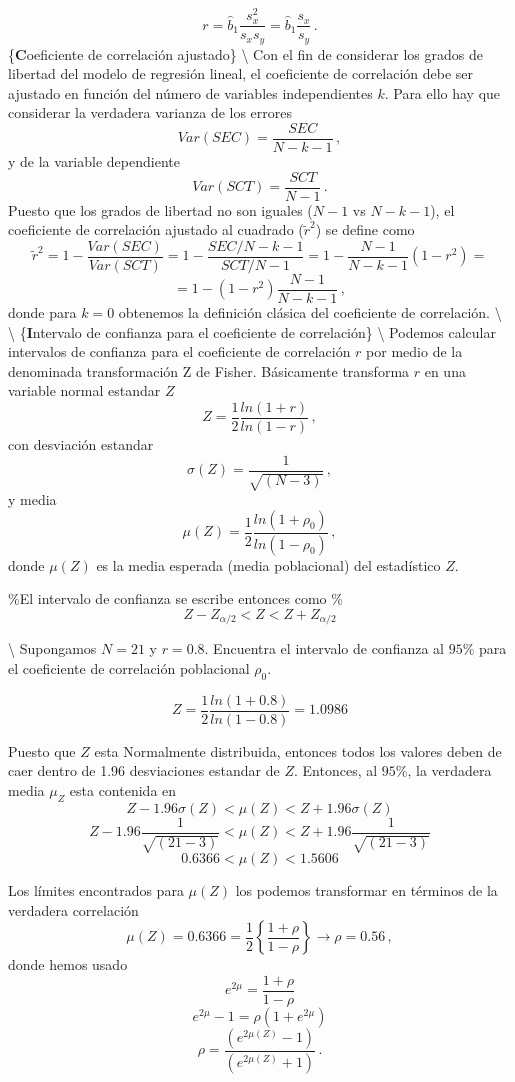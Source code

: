 \documentclass[
]{agujournal2019}
\begin{document}
\[r=\hat{b}_1\frac{s^2_x}{s_x s_y}=\hat{b}_1\frac{s_x}{s_y}\,.\]
\{\textbf Coeficiente de correlación ajustado\} \textbackslash{} Con el
fin de considerar los grados de libertad del modelo de regresión lineal,
el coeficiente de correlación debe ser ajustado en función del número de
variables independientes \(k\). Para ello hay que considerar la
verdadera varianza de los errores \[Var(SEC)=\frac{SEC}{N-k-1}\,,\] y de
la variable dependiente \[Var(SCT)=\frac{SCT}{N-1}\,.\] Puesto que los
grados de libertad no son iguales (\(N-1\) vs \(N-k-1\)), el coeficiente
de correlación ajustado al cuadrado (\(\tilde{r}^2\)) se define como
\[\tilde{r}^2=1-\frac{Var(SEC)}{Var(SCT)}=1-\frac{SEC/N-k-1}{SCT/N-1}=
1-\frac{N-1}{N-k-1}(1-r^2)=\] \[=1-(1-r^2)\frac{N-1}{N-k-1}\,,\] donde
para \(k=0\) obtenemos la definición clásica del coeficiente de
correlación. \textbackslash{} \textbackslash{} \{\textbf Intervalo de
confianza para el coeficiente de correlación\} \textbackslash{} Podemos
calcular intervalos de confianza para el coeficiente de correlación
\(r\) por medio de la denominada transformación Z de Fisher. Básicamente
transforma \(r\) en una variable normal estandar \(Z\)
\[Z=\frac{1}{2}\frac{ln(1+r)}{ln(1-r)}\,,\] con desviación estandar
\[\sigma(Z)=\frac{1}{\sqrt{(N-3)}}\,,\] y media
\[\mu(Z)=\frac{1}{2}\frac{ln(1+\rho_0)}{ln(1-\rho_0)}\,,\] donde
\(\mu(Z)\) es la media esperada (media poblacional) del estadístico
\(Z\).

\%El intervalo de confianza se escribe entonces como
\%\[Z-Z_{\alpha/2}<Z<Z+Z_{\alpha/2}\]

\vspace{0.5cm}

 \textbackslash{} \noindent Supongamos
\(N=21\) y \(r=0.8\). Encuentra el intervalo de confianza al \(95\%\)
para el coeficiente de correlación poblacional \(\rho_0\).

\[Z=\frac{1}{2}\frac{ln(1+0.8)}{ln(1-0.8)}=1.0986\]

\noindent Puesto que \(Z\) esta Normalmente distribuida, entonces todos
los valores deben de caer dentro de 1.96 desviaciones estandar de \(Z\).
Entonces, al \(95\%\), la verdadera media \(\mu_Z\) esta contenida en
\[Z-1.96\sigma(Z) < \mu(Z) < Z + 1.96\sigma(Z)\]
\[Z-1.96\frac{1}{\sqrt{(21-3)}} < \mu(Z) < Z + 1.96\frac{1}{\sqrt{(21-3)}}\]
\[0.6366<\mu(Z)<1.5606\]

\noindent Los límites encontrados para \(\mu(Z)\) los podemos
transformar en términos de la verdadera correlación
\[\mu(Z)=0.6366=\frac{1}{2} \left\{ \frac{1+\rho}{1-\rho} \right\} \rightarrow  \rho=0.56\,,\]
donde hemos usado \[e^{2\mu}=\frac{1+\rho}{1-\rho}\]
\[e^{2\mu}-1=\rho(1+e^{2\mu})\]
\[\rho=\frac{(e^{2\mu(Z)}-1)}{(e^{2\mu(Z)}+1)}\,.\]
\end{document}
